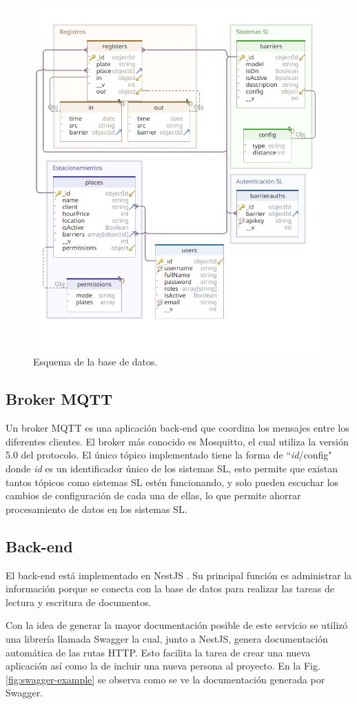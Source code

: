 \begin{figure}[bth]
    \centering
    \includegraphics[width=.5\textwidth]{imgs/db.png}
    \caption{Esquema de la base de datos.}
    \label{fig:db-uml}
\end{figure}

\subsection{Broker MQTT}

Un broker MQTT es una aplicación back-end que coordina los mensajes entre los diferentes clientes.
El broker más conocido es Mosquitto, el cual utiliza la versión 5.0 del protocolo. El único tópico implementado tiene la forma de ``\textit{id}/config" donde \textit{id} es un identificador único de los sistemas SL, esto permite que existan tantos tópicos como sistemas SL estén funcionando, y solo pueden escuchar los cambios de configuración de cada una de ellas, lo que permite ahorrar procesamiento de datos en los sistemas SL.

\subsection{Back-end}

El back-end está implementado en NestJS \cite{noauthor_documentacion_nodate}. Su principal función es administrar la información porque se conecta con la base de datos para realizar las tareas de lectura y escritura de documentos.

Con la idea de generar la mayor documentación posible de este servicio se utilizó una librería llamada Swagger la cual, junto a NestJS, genera documentación automática de las rutas HTTP. Esto facilita la tarea de crear una nueva aplicación así como la de incluir una nueva persona al proyecto. En la Fig. \ref{fig:swagger-example} se observa como se ve la documentación generada por Swagger.

